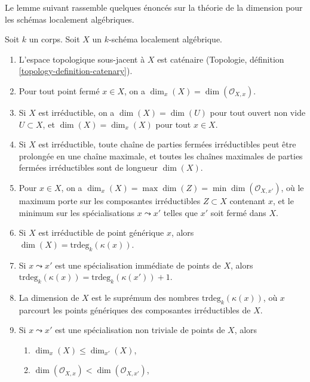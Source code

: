 \noindent
Le lemme suivant rassemble quelques énoncés sur la théorie
de la dimension pour les schémas localement algébriques.

\begin{lemma}
\label{lemma-dimension-locally-algebraic}
Soit $k$ un corps. Soit $X$ un $k$-schéma localement algébrique.
\begin{enumerate}
\item
\label{item-catenary}
L'espace topologique sous-jacent à $X$ est caténaire
(Topologie, définition \ref{topology-definition-catenary}).
\item
\label{item-dimension-at-closed-point}
Pour tout point fermé $x \in X$, on a $\dim_x(X) = \dim(\mathcal{O}_{X, x})$.
\item
\label{item-dimension-irreducible}
Si $X$ est irréductible, on a $\dim(X) = \dim(U)$ pour tout
ouvert non vide $U \subset X$, et $\dim(X) = \dim_x(X)$
pour tout $x \in X$.
\item
\label{item-irreducible-maximal-chains}
Si $X$ est irréductible, toute chaîne de parties fermées irréductibles peut être
prolongée en une chaîne maximale, et toutes les chaînes maximales de parties
fermées irréductibles sont de longueur $\dim(X)$.
\item
\label{item-dimension-irreducibles-passing-through}
Pour $x \in X$, on a
$\dim_x(X) = \max \dim(Z) = \min \dim(\mathcal{O}_{X, x'})$,
où le maximum porte sur les composantes irréductibles
$Z \subset X$ contenant $x$, et le minimum sur les
spécialisations $x \leadsto x'$ telles que $x'$ soit fermé dans $X$.
\item
\label{item-dimension-irreducible-trdeg}
Si $X$ est irréductible de point générique $x$, alors
$\dim(X) = \text{trdeg}_k(\kappa(x))$.
\item
\label{item-immediate-specialization}
Si $x \leadsto x'$ est une spécialisation immédiate
de points de $X$, alors
$\text{trdeg}_k(\kappa(x)) = \text{trdeg}_k(\kappa(x')) + 1$.
\item
\label{item-dimension-sup-trdeg}
La dimension de $X$ est le suprémum des nombres
$\text{trdeg}_k(\kappa(x))$, où $x$ parcourt les
points génériques des composantes irréductibles de $X$.
\item
\label{item-specialization}
Si $x \leadsto x'$ est une spécialisation non triviale de points de $X$, alors
\begin{enumerate}
\item $\dim_x(X) \leq \dim_{x'}(X)$,
\item $\dim(\mathcal{O}_{X, x}) < \dim(\mathcal{O}_{X, x'})$,

\end{enumerate}
\end{enumerate}
\end{lemma}
